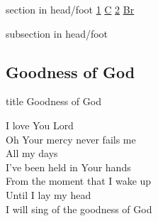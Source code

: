 \documentclass{beamer}
\begin{document}
{
{ 
 {
 \begin{beamercolorbox}[ht=4.5ex,dp=1.5ex,%
      leftskip=.3cm,rightskip=.3cm plus1fil]{section in head/foot}
 \fontsize{12}{25}\selectfont 
\hyperlink{Goodness of God['All my life You have been faithful']1}{1}
\hyperlink{Goodness of God['All my life You have been faithful']C}{C}
\hyperlink{Goodness of God['All my life You have been faithful']2}{2}
\hyperlink{Goodness of God['All my life You have been faithful']Br}{Br}
 
 \end{beamercolorbox}%
  \begin{beamercolorbox}[ht=2.5ex,dp=1.125ex,%
   leftskip=.3cm,rightskip=.3cm plus1fil]{subsection in head/foot}
   \insertauthor
 \end{beamercolorbox}%
 }
}
\subsection{ Goodness of God }

\hypertarget{Goodness of God['All my life You have been faithful']}{}
\begin{frame}{}
 \vfill
  \centering
  \begin{beamercolorbox}[sep=8pt,center,shadow=true,rounded=true]{title}
    Goodness of God     
  \end{beamercolorbox}
  \vfill
\end{frame}

\hypertarget{Goodness of God['All my life You have been faithful']1}{}
\begin{frame}{}
\fontsize{ 20 }{ 27 }\selectfont

I love You Lord\\ 
Oh Your mercy never fails me\\ 
All my days\\ 
I've been held in Your hands\\ 
From the moment that I wake up\\ 
Until I lay my head\\ 
I will sing of the goodness of God 

\end{frame}

\hypertarget{Goodness of God['All my life You have been faithful']C}{}
\begin{frame}{}
\fontsize{ 20 }{ 27 }\selectfont


\end{frame}}
\end{document}
